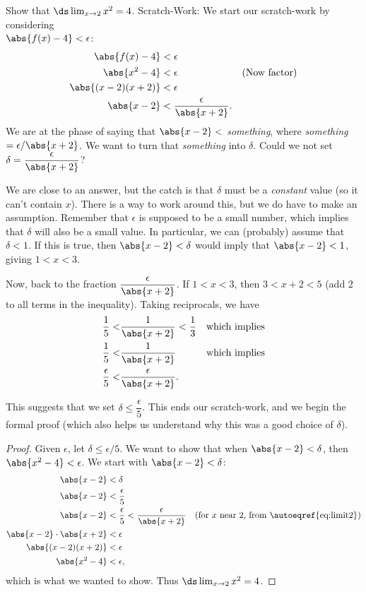 \begin{example}\label{ex_compute_lim2}
Show that $\ds\lim_{x\to2} x^2 = 4$.
\solution
Scratch-Work:
We start our scratch-work by considering\\
$\abs{f(x)-4}<\epsilon$:
\begin{align}
\abs{f(x)-4} &< \epsilon \notag\\
\abs{x^2-4} &< \epsilon & \text{(Now factor)}\notag\\
\abs{(x-2)(x+2)} &< \epsilon \notag\\
\abs{x-2} &<\frac{\epsilon}{\abs{x+2}}.\label{eq:lim1}
\end{align}
We are at the phase of saying that $\abs{x-2}<$ \emph{something}, where \emph{something}$=\epsilon/\abs{x+2}$. We want to turn that \emph{something} into $\delta$. Could we not set $\delta = \dfrac{\epsilon}{\abs{x+2}}$?  

We are close to an answer, but the catch is that $\delta$ must be a \emph{constant} value (so it can't contain $x$).  There is a way to work around this, but we do have to make an assumption.  Remember that $\epsilon$ is supposed to be a small number, which implies that $\delta$ will also be a small value.  In particular, we can (probably) assume that $\delta < 1$.  If this is true, then $\abs{x-2}< \delta$ would imply that $\abs{x-2}< 1$, giving $1 < x < 3$.  

Now, back to the fraction $\dfrac{\epsilon}{\abs{x+2}}$.  If $1<x<3$, then $3<x+2<5$ (add 2 to all terms in the inequality).  Taking reciprocals, we have 
\begin{align}
\frac15 <& \frac1{\abs{x+2}} < \frac 13 & \text{which implies}\notag\\
\frac15 <& \frac1{\abs{x+2}} & \text{which implies}\notag\\
\frac\epsilon5<&\frac{\epsilon}{\abs{x+2}}\text{.}\label{eq:limit2}
\end{align}

This suggests that we set 
$\delta \leq \dfrac{\epsilon}{5}$. This ends our scratch-work, and we begin the formal proof (which also helps us understand why this was a good choice of $\delta$).

\begin{proof}
Given $\epsilon$, let $\delta \leq \epsilon/5$. We want to show that when $\abs{x-2}<\delta$, then $\abs{x^2-4}<\epsilon$. We start with $\abs{x-2}<\delta$:
\begin{align*}
\abs{x-2} &< \delta \\
\abs{x-2} &< \frac{\epsilon}5\\
\abs{x-2} &< \frac\epsilon5 < \frac{\epsilon}{\abs{x+2}} & \text{(for $x$ near 2, from \autoeqref{eq:limit2})}\\
\abs{x-2}\cdot\abs{x+2} &< \epsilon\\
\abs{(x-2)(x+2)} &< \epsilon\\
\abs{x^2-4} &<\epsilon,
\end{align*}
which is what we wanted to show. Thus $\ds \lim_{x\to 2}x^2 = 4$.
\end{proof}


\end{example}
